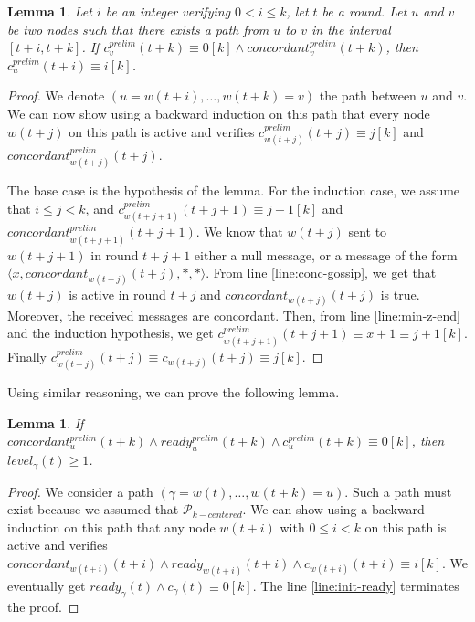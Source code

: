 \documentclass[11pt,letterpaper]{article}
\newtheorem{lem}[thm]{Lemma}
\newcommand{\cent}{\gamma}
\begin{document}
\begin{lem} \label{lem:conc-safety}
	Let $i$ be an integer verifying $0 < i \leq k$, let $t$ be a round. Let $u$ and $v$ be two nodes such that there exists a path from $u$ to $v$ in the interval $[t+i,t+k]$.
	If $c^{prelim}_v(t+k) \equiv 0 [k] \wedge concordant^{prelim}_v(t+k)$, then $c_u^{prelim}(t+i) \equiv i [k]$.
\end{lem}
\begin{proof}
	We denote $(u = w(t+i), \dots, w(t+k) = v)$ the path between $u$ and $v$.
	We can now show using a backward induction on this path that every node $w(t+j)$ on this path is active
	and verifies $c_{w(t+j)}^{prelim}(t+j) \equiv j [k]$ and $concordant_{w(t+j)}^{prelim}(t+j)$.

	The base case is the hypothesis of the lemma.
	For the induction case, we assume that $i \leq j < k$, and $c_{w(t+j+1)}^{prelim}(t+j+1) \equiv j+1 [k]$ and $concordant_{w(t+j+1)}^{prelim}(t+j+1)$.
	We know that $w(t+j)$ sent to $w(t+j+1)$ in round $t+j+1$ either a null message, or a message of the form $\langle x, concordant_{w(t+j)}(t+j), *, * \rangle$.
	From line \ref{line:conc-gossip}, we get that $w(t+j)$ is active in round $t+j$ and $concordant_{w(t+j)}(t+j)$ is true. Moreover, the received messages are concordant.
	Then, from line \ref{line:min-z-end} and the induction hypothesis, we get $c_{w(t+j+1)}^{prelim}(t+j+1) \equiv x+1 \equiv j+1 [k]$.
	Finally $c_{w(t+j)}^{prelim}(t+j) \equiv c_{w(t+j)}(t+j) \equiv j [k]$.
\end{proof}

\noindent Using similar reasoning, we can prove the following lemma.
\begin{lem} \label{lem:conc-safety-bis}
	If $concordant_u^{prelim}(t+k) \wedge ready_u^{prelim}(t+k) \wedge c_u^{prelim}(t+k) \equiv 0 [k]$, then $level_\cent(t) \geq 1$.
\end{lem}
\begin{proof}
	We consider a path $(\cent = w(t), \dots, w(t+k) = u)$. Such a path must exist because we assumed that $\mathcal{P}_{k-centered}$.
	We can show using a backward induction on this path that any node $w(t+i)$ with $0 \leq i < k$ on this path is active and verifies
	$concordant_{w(t+i)}(t+i) \wedge ready_{w(t+i)}(t+i) \wedge c_{w(t+i)}(t+i) \equiv i [k]$.
	We eventually get $ready_\cent(t) \wedge c_\cent(t) \equiv 0 [k]$. The line \ref{line:init-ready} terminates the proof.
\end{proof}
\end{document}
